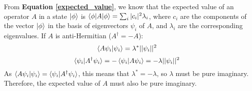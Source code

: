 From \textbf{Equation \ref{expected_value}}, we know that the expected value of an operator $A$ in a state $\ket{\phi}$ is $\braket{\phi|A|\phi} = \sum_i|c_i|^2\lambda_i$, where $c_i$ are the components of the vector $\ket{\phi}$ in the basis of eigenvectors $\psi_i$ of $A$, and $\lambda_i$ are the corresponding eigenvalues. If $A$ is anti-Hermitian ($A^\dagger = -A$):
\begin{equation}
    \braket{A\psi_i|\psi_i} = \lambda^*||\psi_i||^2
\end{equation}
\begin{equation}
    \braket{\psi_i|A^\dagger\psi_i} = -\braket{\psi_i|A\psi_i} = -\lambda||\psi_i||^2
\end{equation} 
As $\braket{A\psi_i|\psi_i} = \braket{\psi_i|A^\dagger \psi_i}$, this means that $\lambda^* = -\lambda$, so $\lambda$ must be pure imaginary. Therefore, the expected value of $A$ must also be pure imaginary.
